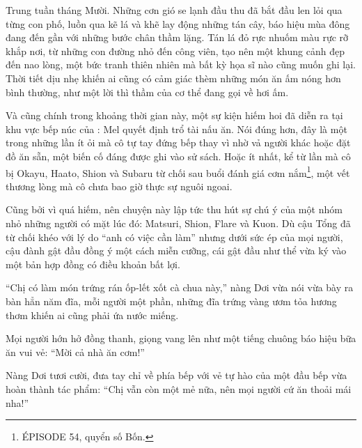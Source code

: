 \documentclass[../main.tex]{subfiles}
\begin{document}

Trung tuần tháng Mười. Những cơn gió se lạnh đầu thu đã bắt đầu len lỏi qua từng con phố, luồn qua kẽ lá và khẽ lay động những tán cây, báo hiệu mùa đông đang đến gần với những bước chân thầm lặng. Tán lá đỏ rực nhuốm màu rực rỡ khắp nơi, từ những con đường nhỏ đến công viên, tạo nên một khung cảnh đẹp đến nao lòng, một bức tranh thiên nhiên mà bất kỳ họa sĩ nào cũng muốn ghi lại. Thời tiết dịu nhẹ khiến ai cũng có cảm giác thèm những món ăn ấm nóng hơn bình thường, như một lời thì thầm của cơ thể đang gọi về hơi ấm.

Và cũng chính trong khoảng thời gian này, một sự kiện hiếm hoi đã diễn ra tại khu vực bếp núc của \hll: Mel quyết định trổ tài nấu ăn. Nói đúng hơn, đây là một trong những lần ít ỏi mà cô tự tay đứng bếp thay vì nhờ vả người khác hoặc đặt đồ ăn sẵn, một biến cố đáng được ghi vào sử sách. Hoặc ít nhất, kể từ lần mà cô bị Okayu, Haato, Shion và Subaru từ chối sau buổi đánh giá cơm nắm\footnote{{\flaregothic ÉPISODE 54}, quyển số Bốn.}, một vết thương lòng mà cô chưa bao giờ thực sự nguôi ngoai.

Cũng bởi vì quá hiếm, nên chuyện này lập tức thu hút sự chú ý của một nhóm nhỏ những người có mặt lúc đó: Matsuri, Shion, Flare và Kuon. Dù cậu Tổng đã từ chối khéo với lý do ``anh có việc cần làm'' nhưng dưới sức ép của mọi người, cậu đành gật đầu đồng ý một cách miễn cưỡng, cái gật đầu như thể vừa ký vào một bản hợp đồng có điều khoản bất lợi.

``Chị có làm món trứng rán ốp-lết xốt cà chua này,'' nàng Dơi vừa nói vừa bày ra bàn hẳn năm đĩa, mỗi người một phần, những đĩa trứng vàng ươm tỏa hương thơm khiến ai cũng phải ứa nước miếng.

Mọi người hớn hở đồng thanh, giọng vang lên như một tiếng chuông báo hiệu bữa ăn vui vẻ: ``Mời cả nhà ăn cơm!''


Nàng Dơi tươi cười, đưa tay chỉ về phía bếp với vẻ tự hào của một đầu bếp vừa hoàn thành tác phẩm: ``Chị vẫn còn một mẻ nữa, nên mọi người cứ ăn thoải mái nha!''
\end{document}
